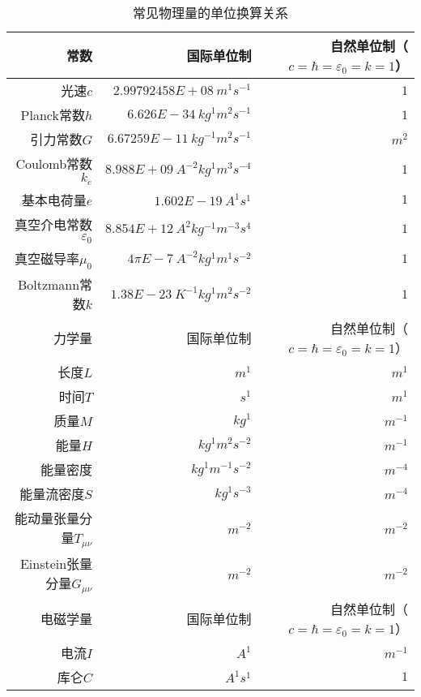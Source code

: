 		
		\begin{table}[!htbp]
			\centering
			\caption{常见物理量的单位换算关系}\label{tab:Dimensional}%
			\begin{tabular*}{\hsize}{@{}@{\extracolsep{\fill}}rrr@{}}
				\toprule
				常数							&				国际单位制					&	自然单位制（$c=\hbar=\varepsilon_0=k=1$）	\\
				\midrule
				光速$c$							&	$2.99792458E+08\ m^{1}s^{-1}$			&	$1$							\\
				Planck常数$h$					&	$6.626E-34\ kg^{1}m^{2}s^{-1}$			&	$1$							\\
				引力常数$G$						&	$6.67259E-11\ kg^{-1}m^{2}s^{-1}$		&	$m^{2}$						\\
				Coulomb常数$k_e$				&	$8.988E+09\ A^{-2}kg^{1}m^{3}s^{-4}$	&	$1$							\\
				基本电荷量$e$					&	$1.602E-19\ A^{1}s^{1}$					&	$1$							\\
				真空介电常数$\varepsilon_0$		&	$8.854E+12\ A^{2}kg^{-1}m^{-3}s^{4}$	&	$1$							\\
				真空磁导率$\mu_0$				&	$4\pi E-7\ A^{-2}kg^{1}m^{1}s^{-2}$		&	$1$							\\
				Boltzmann常数$k$				&	$1.38 E-23\ K^{-1}kg^{1}m^{2}s^{-2}$	&	$1$							\\
				\midrule
				力学量							&				国际单位制					&	自然单位制（$c=\hbar=\varepsilon_0=k=1$）	\\
				\midrule
				长度$L$							&	$m^{1}$									&	 $m^{1}$					\\
				时间$T$							&	$s^{1}$									&	 $m^{1}$					\\
				质量$M$							&	$kg^{1}$								&	 $m^{-1}$					\\
				能量$H$							&	$kg^{1}m^{2}s^{-2}$						&	$m^{-1}$					\\
				能量密度						&	$kg^{1}m^{-1}s^{-2}$					&	$m^{-4}$					\\
				能量流密度$S$					&	$kg^{1}s^{-3}$							&	$m^{-4}$					\\
				能动量张量分量$T_{\mu\nu}$		&	$m^{-2}$								&	$m^{-2}$					\\
				Einstein张量分量$G_{\mu\nu}$	&	$m^{-2}$								&	$m^{-2}$					\\
				\midrule
				电磁学量						&				国际单位制					&	自然单位制（$c=\hbar=\varepsilon_0=k=1$）	\\
				\midrule
				电流$I$							&	$A^{1}$									&	 $m^{-1}$					\\
				库仑$C$							&	$A^{1}s^{1}$							&	 $1$						\\

\end{tabular*}
\end{table}
